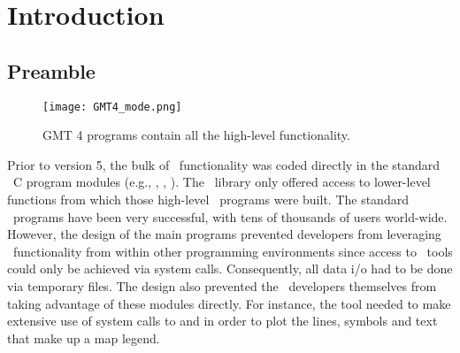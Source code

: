 \documentclass[11pt]{report}
\begin{document}

\clearpage

\tableofcontents

\pagestyle{headings}

\chapter{Introduction}

\section{Preamble}

\begin{figure}[h]
	\centering
	\texttt{[image: GMT4\_mode.png]}
	\caption{GMT 4 programs contain all the high-level functionality.}
\end{figure}
Prior to version 5, the bulk of \GMT\ functionality was coded directly
in the standard \GMT\ C program modules (e.g., , , ).
The \GMT\ library only offered access to lower-level functions from which those
high-level \GMT\ programs were built.  The standard \GMT\ programs have been very successful,
with tens of thousands of users world-wide.  However, the design of the main programs
prevented developers from leveraging \GMT\ functionality from within other
programming environments since access to \GMT\ tools could only be achieved
via system calls.  Consequently, all data i/o had to be done via temporary files.
The design also prevented the \GMT\ developers themselves from taking advantage of these
modules directly.  For instance, the tool  needed to make extensive use of system calls
to  and  in order to plot the lines, symbols and text
that make up a map legend.
\end{document}
